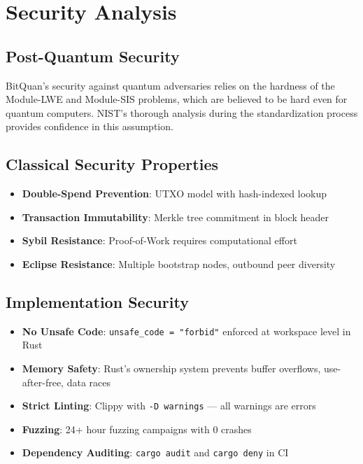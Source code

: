 \documentclass[11pt,a4paper]{article}
\begin{document}
\section{Security Analysis}

\subsection{Post-Quantum Security}

BitQuan's security against quantum adversaries relies on the hardness of the Module-LWE and Module-SIS problems, which are believed to be hard even for quantum computers. NIST's thorough analysis during the standardization process provides confidence in this assumption.

\subsection{Classical Security Properties}

\begin{itemize}[leftmargin=*]
    \item \textbf{Double-Spend Prevention}: UTXO model with hash-indexed lookup
    \item \textbf{Transaction Immutability}: Merkle tree commitment in block header
    \item \textbf{Sybil Resistance}: Proof-of-Work requires computational effort
    \item \textbf{Eclipse Resistance}: Multiple bootstrap nodes, outbound peer diversity
\end{itemize}

\subsection{Implementation Security}

\begin{itemize}[leftmargin=*]
    \item \textbf{No Unsafe Code}: \texttt{unsafe\_code = "forbid"} enforced at workspace level in Rust
    \item \textbf{Memory Safety}: Rust's ownership system prevents buffer overflows, use-after-free, data races
    \item \textbf{Strict Linting}: Clippy with \texttt{-D warnings} — all warnings are errors
    \item \textbf{Fuzzing}: 24+ hour fuzzing campaigns with 0 crashes
    \item \textbf{Dependency Auditing}: \texttt{cargo audit} and \texttt{cargo deny} in CI
\end{itemize}
\end{document}
